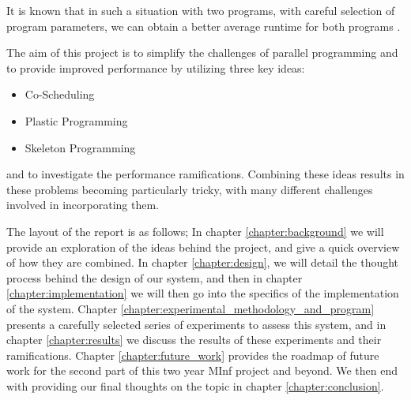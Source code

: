 It is known that in such a situation with two programs, with careful selection of program parameters, we can obtain a better average runtime for both programs \cite{lira}.

The aim of this project is to simplify the challenges of parallel programming and to provide improved performance by utilizing three key ideas:

\begin{itemize}
	\item Co-Scheduling
	\item Plastic Programming
	\item Skeleton Programming
\end{itemize}

and to investigate the performance ramifications. Combining these ideas results in these problems becoming particularly tricky, with many different challenges involved in incorporating them.

The layout of the report is as follows; In chapter \ref{chapter:background} we will provide an exploration of the ideas behind the project, and give a quick overview of how they are combined. In chapter \ref{chapter:design}, we will detail the thought process behind the design of our system, and then in chapter \ref{chapter:implementation} we will then go into the specifics of the implementation of the system. Chapter \ref{chapter:experimental_methodology_and_program} presents a carefully selected series of experiments to assess this system, and in chapter \ref{chapter:results} we discuss the results of these experiments and their ramifications. Chapter \ref{chapter:future_work} provides the roadmap of future work for the second part of this two year MInf project and beyond. We then end with providing our final thoughts on the topic in chapter \ref{chapter:conclusion}.
